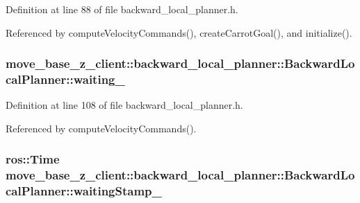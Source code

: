 Definition at line 88 of file backward\+\_\+local\+\_\+planner.\+h.



Referenced by compute\+Velocity\+Commands(), create\+Carrot\+Goal(), and initialize().

\subsubsection[{\texorpdfstring{waiting\+\_\+}{waiting_}}]{ move\+\_\+base\+\_\+z\+\_\+client\+::backward\+\_\+local\+\_\+planner\+::\+Backward\+Local\+Planner\+::waiting\+\_\+\hspace{0.3cm}{\ttfamily [private]}}\hypertarget{classmove__base__z__client_1_1backward__local__planner_1_1BackwardLocalPlanner_a6969156ab6f82e03418987af4c5bd589}{}\label{classmove__base__z__client_1_1backward__local__planner_1_1BackwardLocalPlanner_a6969156ab6f82e03418987af4c5bd589}


Definition at line 108 of file backward\+\_\+local\+\_\+planner.\+h.



Referenced by compute\+Velocity\+Commands().

\subsubsection[{\texorpdfstring{waiting\+Stamp\+\_\+}{waitingStamp_}}]{\setlength{\rightskip}{0pt plus 5cm}ros\+::\+Time move\+\_\+base\+\_\+z\+\_\+client\+::backward\+\_\+local\+\_\+planner\+::\+Backward\+Local\+Planner\+::waiting\+Stamp\+\_\+\hspace{0.3cm}{\ttfamily [private]}}\hypertarget{classmove__base__z__client_1_1backward__local__planner_1_1BackwardLocalPlanner_aea0e5312bd482daafc0b8779efaf56a0}{}\label{classmove__base__z__client_1_1backward__local__planner_1_1BackwardLocalPlanner_aea0e5312bd482daafc0b8779efaf56a0}


